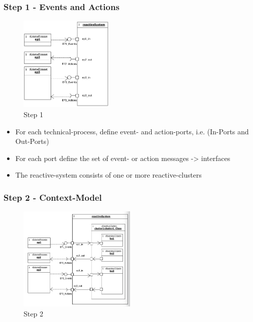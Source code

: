 \hypertarget{step-1---events-and-actions}{%
\subsubsection{Step 1 - Events and
Actions}\label{step-1---events-and-actions}}

\begin{figure}[H]
\centering
\includegraphics[width=0.4\textwidth]{figures/step1ReactiveMachineModelsDevelopment.png}
\caption{Step 1}
\end{figure}

\begin{itemize}
\tightlist
\item
  For each technical-process, define event- and action-ports, i.e.
  (In-Ports and Out-Ports)
\item
  For each port define the set of event- or action messages
  -\textgreater{} interfaces
\item
  The reactive-system consists of one or more reactive-clusters
\end{itemize}

\hypertarget{step-2---context-model}{%
\subsubsection{Step 2 - Context-Model}\label{step-2---context-model}}

\begin{figure}[H]
\centering
\includegraphics[width=0.5\textwidth]{figures/step2ReactiveMachineModelsDevelopment.png}
\caption{Step 2}
\end{figure}

